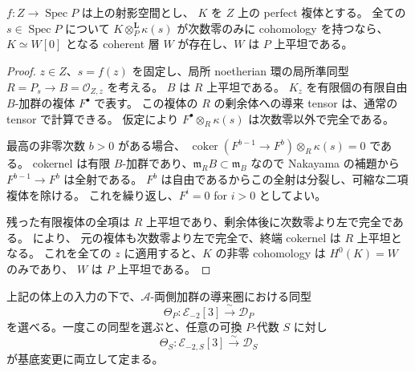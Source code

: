 \begin{lemma}[相対振幅零の判定]\label{lem:relative-serre-amplitude-zero}
$f:Z\to\operatorname{Spec}P$ は上の射影空間とし、
$K$ を $Z$ 上の perfect 複体とする。
全ての $s\in\operatorname{Spec}P$ について
$K\otimes_P^{\mathbf L}\kappa(s)$ が次数零のみに cohomology を持つなら、
$K\simeq W[0]$ となる coherent 層 $W$ が存在し、$W$ は $P$ 上平坦である。
\end{lemma}

\begin{proof}
$z\in Z$、$s=f(z)$ を固定し、局所 noetherian 環の局所準同型
$R=P_s\to B=\mathcal O_{Z,z}$ を考える。
$B$ は $R$ 上平坦である。
$K_z$ を有限個の有限自由 $B$-加群の複体 $F^\bullet$ で表す。
この複体の $R$ の剰余体への導来 tensor は、通常の tensor で計算できる。
仮定により $F^\bullet\otimes_R\kappa(s)$ は次数零以外で完全である。

最高の非零次数 $b>0$ がある場合、
$\operatorname{coker}(F^{b-1}\to F^b)\otimes_R\kappa(s)=0$ である。
cokernel は有限 $B$-加群であり、$\mathfrak m_RB\subset\mathfrak m_B$ なので
Nakayama の補題から $F^{b-1}\to F^b$ は全射である。
$F^b$ は自由であるからこの全射は分裂し、可縮な二項複体を除ける。
これを繰り返し、$F^i=0$ for $i>0$ としてよい。

残った有限複体の全項は $R$ 上平坦であり、剰余体後に次数零より左で完全である。
\cite[Lemma~10.99.5, Tag~\texttt{00MI}]{StacksRelativeDuality}により、
元の複体も次数零より左で完全で、終端 cokernel は $R$ 上平坦となる。
これを全ての $z$ に適用すると、$K$ の非零 cohomology は $H^0(K)=W$ のみであり、
$W$ は $P$ 上平坦である。
\end{proof}

\begin{proposition}[双対両側加群の相対的同定]
\label{prop:relative-serre-dual-bimodule}
上記の体上の入力の下で、$\mathscr A$-両側加群の導来圏における同型
\begin{equation}\label{eq:relative-serre-global-dual}
 \Theta_P:\mathscr E_{-2}[3]\xrightarrow{\ \sim\ }\mathscr D_P
\end{equation}
を選べる。一度この同型を選ぶと、任意の可換 $P$-代数 $S$ に対し
\begin{equation}\label{eq:relative-serre-all-base-dual}
 \Theta_S:\mathscr E_{-2,S}[3]\xrightarrow{\ \sim\ }\mathscr D_S
\end{equation}
が基底変更に両立して定まる。
\end{proposition}

